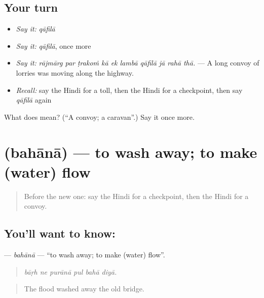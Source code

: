 \subsection*{Your turn}
\begin{itemize}
\raggedright
  \item \emph{Say it:} \emph{qāfilā}
  \item \emph{Say it:} \emph{qāfilā}, once more
  \item \emph{Say it:} \emph{rājmārg par ṭrakoṁ kā ek lambā qāfilā jā rahā thā.} — A long convoy of lorries was moving along the highway.
  \item \emph{Recall:} say the Hindi for a toll, then the Hindi for a checkpoint, then say \emph{qāfilā} again
\end{itemize}

\begin{tcolorbox}[breakable,colback=teal!4,colframe=teal!35!black,title={Before you move on}]
What does  mean? (\textquotedblleft{}A convoy; a caravan\textquotedblright{}.) Say it once more.
\end{tcolorbox}
\section[\texorpdfstring{\hi{बहाना} (bahānā)}{बहाना (bahānā)}]{ (bahānā) — to wash away; to make (water) flow}

\label{lesson:HI-C407-bahana}



\begin{quote}
Before the new one: say the Hindi for a checkpoint, then the Hindi for a convoy.
\end{quote}

\subsection*{You'll want to know: }
\textbf{} — \emph{bahānā} — \textquotedblleft{}to wash away; to make (water) flow\textquotedblright{}.

\begin{quote}
     
\end{quote}

\begin{quote}
\emph{bāṛh ne purānā pul bahā diyā.}
\end{quote}

\begin{quote}
The flood washed away the old bridge.
\end{quote}

